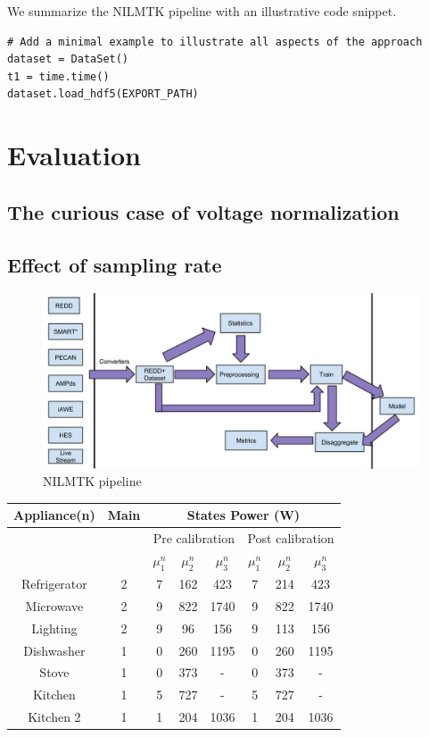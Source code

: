 \documentclass{sig-alternate}
\begin{document}
We summarize the NILMTK pipeline with an illustrative code snippet.
\begin{verbatim}
# Add a minimal example to illustrate all aspects of the approach
dataset = DataSet()
t1 = time.time()
dataset.load_hdf5(EXPORT_PATH)
\end{verbatim}


\section{Evaluation}
\label{evaluation}
\subsection{The curious case of voltage normalization}
\subsection{Effect of sampling rate}
\begin{figure}
\centering \includegraphics[scale=0.4]{figures/pipeline.jpg}
\caption{NILMTK pipeline}
\label{fig:pipeline}
\end{figure}


\begin{tabular}{|c|c|c|c|c|c|c|c|}
\hline
Appliance(n) & Main & \multicolumn{6}{|c|}{States Power (W)}\\
\hline
&&\multicolumn{3}{|c|}{Pre calibration}&\multicolumn{3}{|c|}{Post calibration}\\
\hline
             &  &$\mu^n_1$&$\mu^n_2$&$\mu^n_3$&$\mu^n_1$&$\mu^n_2$&$\mu^n_3$\\[0.1cm]
\hline
Refrigerator & 2& 7&162&423 & 7&214&423\\
Microwave &2& 9&822&1740& 9&822&1740\\
Lighting & 2& 9&96&156&9&113&156\\
Dishwasher & 1& 0&260& 1195 & 0&260& 1195\\
Stove& 1 & 0&373&-& 0&373&-\\
Kitchen & 1& 5&727&-&5&727&-\\
Kitchen 2&1 & 1&204&1036&1&204&1036 \\
%
%
\hline
%
\end{tabular}
\end{document}
